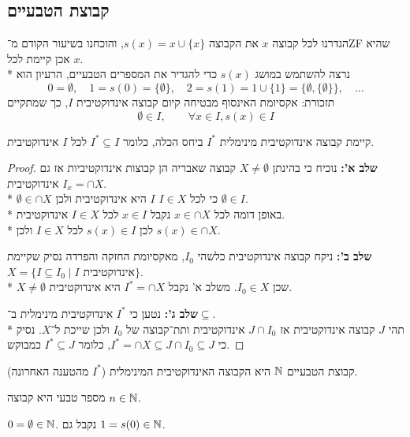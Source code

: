 \subsection{קבוצת הטבעיים}
הגדרנו לכל קבוצה $x$ את הקבוצה $s(x) = x \cup \{ x \}$, והוכחנו בשיעור הקודם מ־ZF שהיא אכן קיימת לכל $x$. \\*
נרצה להשתמש במושג $s(x)$ כדי להגדיר את המספרים הטבעיים, הרעיון הוא
\[
	0 = \emptyset,
	\quad
	1 = s(0) = \{ \emptyset \},
	\quad
	2 = s(1) = 1 \cup \{ 1 \} = \{ \emptyset, \{ \emptyset \} \},
	\quad
	\dots
\]
תזכורת: אקסיומת האינסוף מבטיחה קיום קבוצה אינדוקטיבית $I$, כך שמתקיים
\[
	\emptyset \in I,
	\qquad
	\forall x \in I, s(x) \in I
\]
\begin{proposition}
	קיימת קבוצה אינדוקטיבית מינימלית $I^*$ ביחס הכלה, כלומר $I^* \subseteq I$ לכל $I$ אינדוקטיבית.
\end{proposition}
\begin{proof}
	\textbf{שלב א':}
	נוכיח כי בהינתן $X \ne \emptyset$ קבוצה שאבריה הן קבוצות אינדוקטיביות אז גם $I_x = \cap X$ אינדוקטיבית. \\*
	$\emptyset \in \cap X$ כי לכל $I \in X$ $I$ היא אינדוקטיבית ולכן $\emptyset \in I$. \\*
	באופן דומה לכל $x \in \cap X$ נקבל $x \in I$ לכל $I \in X$ אינדוקטיבית. \\*
	לכן $s(x) \in I$ לכל $I \in X$ ולכן $s(x) \in \cap X$.

	\textbf{שלב ב':}
	ניקח קבוצה אינדוקטיבית כלשהי $I_0$, מאקסיומת החזקה והפרדה נסיק שקיימת $X = \{ I \subseteq I_0 \mid I \text{ אינדוקטיבית} \}$. \\*
	$X \ne \emptyset$ שכן $I_0 \in X$. משלב א' נקבל $I^* = \cap X$ היא אינדוקטיבית.

	\textbf{שלב ג':}
	נטען כי $I^*$ אינדוקטיבית מינימלית ב־$\subseteq$. \\*
	תהי $J$ קבוצה אינדוקטיבית אז $J \cap I_0$ אינדוקטיבית ותת־קבוצה של $I_0$ ולכן שייכת ל־$X$.
	נסיק כי $I^* = \cap X \subseteq J \cap I_0 \subseteq J$,
	כלומר $I^* \subseteq J$ כמבוקש.
\end{proof}
\begin{definition}
	קבוצת הטבעיים $\mathbb{N}$ היא הקבוצה האינדוקטיבית המינימלית ($I^*$ מהטענה האחרונה).
\end{definition}
\begin{conclusion}
	מספר טבעי היא קבוצה $n \in \mathbb{N}$.
\end{conclusion}
\begin{example}
	$0 = \emptyset \in \mathbb{N}$.
	נקבל גם $1 = s(0) \in \mathbb{N}$.
\end{example}

